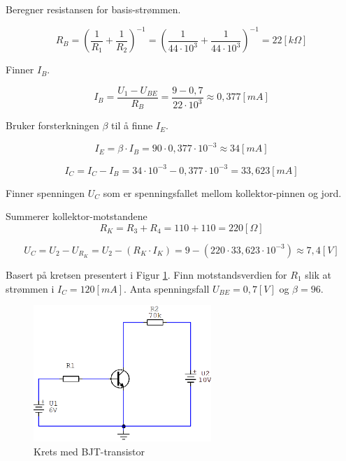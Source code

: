 \vspace{0.5cm} %

\begin{solution}[name=Løsningsforslag oppgave]
Beregner resistansen for basis-strømmen.

\[R_B= \left(\frac{1}{R_1} + \frac{1}{R_2} \right)^{-1} = \left( \frac{1}{44\cdot 10^3} + \frac{1}{44 \cdot 10^3}\right)^{-1}= 22 [k\Omega]\]

Finner $I_B$.

\[I_B = \frac{U_1-U_{BE}}{R_B} = \frac{9-0,7}{22 \cdot 10^3} \approx 0,377 [mA]\]

Bruker forsterkningen $\beta$ til å finne $I_E$.

\[I_E = \beta \cdot I_B = 90 \cdot 0,377 \cdot 10^{-3} \approx 34 [mA] \]

\[I_C = I_C - I_B = 34 \cdot 10^{-3} - 0,377 \cdot 10^{-3} = 33,623 [mA]\]

Finner spenningen $U_C$ som er spenningsfallet mellom kollektor-pinnen og jord.

Summerer kollektor-motstandene
\[R_K = R_3+R_4=110+110=220 [\Omega]\]

\[U_C=U_2-U_{R_{K}} = U_2 - \left( R_K \cdot I_K \right)=9- \left( 220 \cdot 33,623 \cdot 10^{-3} \right) \approx 7,4 [V]\]

\end{solution}

\vspace{0.5cm} %

\begin{question}[name=Oppgave, topic=transBJT]
	Basert på kretsen presentert i Figur \ref{fig:tranBJT5}. Finn motstandsverdien for $R_1$ slik at strømmen i $I_C=120 [mA]$. Anta spenningsfall $U_{BE}=0,7[V]$ og $\beta=96$.
	
	\begin{figure}[H]
		\centering
		\includegraphics[width=0.6\textwidth]{transistor-BJT/figurer/krets5.png}
		\caption{Krets med BJT-transistor}
		\label{fig:tranBJT5}
	\end{figure}
	
\end{question}

